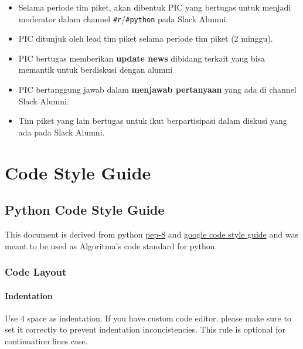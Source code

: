 \documentclass[
]{book}
\providecommand{\tightlist}{%
  \setlength{\itemsep}{0pt}\setlength{\parskip}{0pt}}
\begin{document}
\begin{itemize}
\tightlist
\item
  Selama periode tim piket, akan dibentuk PIC yang bertugas untuk menjadi moderator dalam channel \texttt{\#r}/\texttt{\#python} pada Slack Alumni.
\item
  PIC ditunjuk oleh lead tim piket selama periode tim piket (2 minggu).
\item
  PIC bertugas memberikan \textbf{update news} dibidang terkait yang bisa memantik untuk berdiskusi dengan alumni
\item
  PIC bertanggung jawab dalam \textbf{menjawab pertanyaan} yang ada di channel Slack Alumni.
\item
  Tim piket yang lain bertugas untuk ikut berpartisipasi dalam diskusi yang ada pada Slack Alumni.
\end{itemize}

\hypertarget{code-style-guide}{%
\chapter{Code Style Guide}\label{code-style-guide}}

\hypertarget{python-code-style-guide}{%
\section{Python Code Style Guide}\label{python-code-style-guide}}

This document is derived from python \href{https://www.python.org/dev/peps/pep-0008/}{pep-8} and \href{https://google.github.io/styleguide/pyguide.html}{google code style guide} and was meant to be used as Algoritma's code standard for python.

\hypertarget{code-layout}{%
\subsection{Code Layout}\label{code-layout}}

\hypertarget{indentation}{%
\subsubsection{Indentation}\label{indentation}}

Use 4 space as indentation. If you have custom code editor, please make sure to set it correctly to prevent indentation inconcistencies. This rule is optional for continuation lines case.
\end{document}
